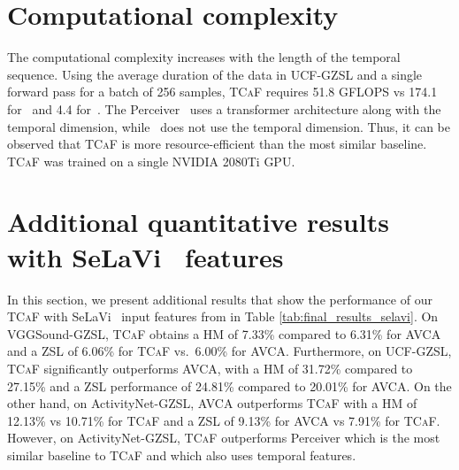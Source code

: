 \documentclass[runningheads]{llncs}
\newcommand{\modelName}{\textsc{TCaF}\xspace}
\newcommand{\ucf}{{UCF-GZSL}\xspace}
\newcommand{\selaactivity}{{ActivityNet-GZSL}\xspace}
\newcommand{\selaucf}{{UCF-GZSL}\xspace}
\newcommand{\selavgg}{{VGGSound-GZSL}\xspace}
\begin{document}
\section{Computational complexity}
\label{section:computational_complexity}
The computational complexity increases with the length
of the temporal sequence. Using the average duration of the data in \ucf and
a single forward pass for a batch of 256 samples, \modelName
requires 51.8 GFLOPS vs 174.1 for~\cite{jaegle2021perceiver} and 4.4 for~\cite{mercea2022}. The Perceiver~\cite{jaegle2021perceiver} uses a transformer architecture along with the temporal dimension, while~\cite{mercea2022} does not use the temporal dimension. Thus, it can be observed that \modelName is more resource-efficient than the most similar baseline.
\modelName was trained on a single NVIDIA 2080Ti GPU.




\section{Additional quantitative results with SeLaVi~\cite{asano2020labelling} features}
\label{section:selavi_results}
In this section, we present additional results that show the performance of our \modelName with SeLaVi~\cite{asano2020labelling} input features from \cite{mercea2022} in Table \ref{tab:final_results_selavi}. On \selavgg, \modelName obtains a HM of 7.33\% compared to 6.31\% for AVCA and a ZSL of 6.06\% for \modelName vs.\ 6.00\% for AVCA. Furthermore, on \selaucf, \modelName significantly outperforms AVCA, with a HM of 31.72\% compared to 27.15\% and a ZSL performance of 24.81\% compared to 20.01\% for AVCA. On the other hand, on \selaactivity, AVCA outperforms \modelName with a HM of 12.13\% vs 10.71\% for \modelName and a ZSL of 9.13\% for AVCA vs 7.91\% for \modelName. However, on \selaactivity, \modelName outperforms Perceiver which is the most similar baseline to \modelName and which also uses temporal features. 
\end{document}
